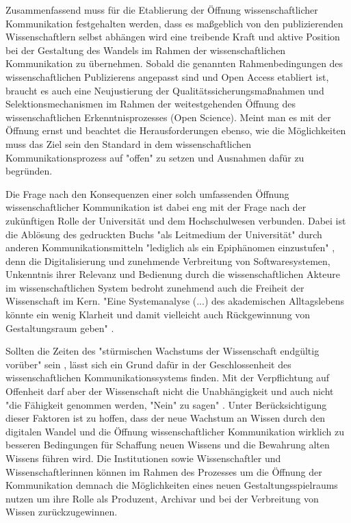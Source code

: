 Zusammenfassend muss für die Etablierung der Öffnung wissenschaftlicher Kommunikation festgehalten werden, dass es maßgeblich von den publizierenden Wissenschaftlern selbst abhängen wird eine treibende Kraft und aktive Position bei der Gestaltung des Wandels im Rahmen der wissenschaftlichen Kommunikation zu übernehmen. Sobald die genannten Rahmenbedingungen des wissenschaftlichen Publizierens angepasst sind und Open Access etabliert ist, braucht es auch eine Neujustierung der Qualitätssicherungsmaßnahmen und Selektionsmechanismen im Rahmen der weitestgehenden Öffnung des wissenschaftlichen Erkenntnisprozesses (Open Science). Meint man es mit der Öffnung ernst und beachtet die Herausforderungen ebenso, wie die Möglichkeiten muss das Ziel sein den Standard in dem wissenschaftlichen Kommunikationsprozess auf "offen" zu setzen und Ausnahmen dafür zu begründen.

Die Frage nach den Konsequenzen einer solch umfassenden Öffnung wissenschaftlicher Kommunikation ist dabei eng mit der Frage nach der zukünftigen Rolle der Universität und dem Hochschulwesen verbunden. Dabei ist die Ablösung des gedruckten Buchs "als Leitmedium der Universität" durch anderen Kommunikationsmitteln "lediglich als ein Epiphänomen einzustufen" \cite{Warnke_2012}, denn die Digitalisierung und zunehmende Verbreitung von Softwaresystemen, Unkenntnis ihrer Relevanz und Bedienung durch die wissenschaftlichen Akteure im wissenschaftlichen System bedroht zunehmend auch die Freiheit der Wissenschaft im Kern. "Eine Systemanalyse (...) des akademischen Alltagslebens  könnte ein wenig Klarheit und damit vielleicht auch Rückgewinnung von Gestaltungsraum geben" \cite{Warnke_2012}.

Sollten die Zeiten des "stürmischen Wachstums der Wissenschaft endgültig vorüber" sein \cite{K_lbel_2002}, lässt sich ein Grund dafür in der Geschlossenheit des wissenschaftlichen Kommunikationssystems finden. Mit der Verpflichtung auf Offenheit darf aber der Wissenschaft nicht die Unabhängigkeit und auch nicht "die Fähigkeit genommen werden, "Nein" zu sagen" \cite{suchen_Hornbostel_2006}. Unter Berücksichtigung dieser Faktoren ist zu hoffen, dass der neue Wachstum an Wissen durch den digitalen Wandel und die Öffnung wissenschaftlicher Kommunikation wirklich zu besseren Bedingungen für Schaffung neuen Wissens und die Bewahrung alten Wissens führen wird. Die Institutionen sowie Wissenschaftler und Wissenschaftlerinnen können im Rahmen des Prozesses um die Öffnung der Kommunikation demnach die Möglichkeiten eines neuen Gestaltungsspielraums nutzen um ihre Rolle als Produzent, Archivar und bei der Verbreitung von Wissen zurückzugewinnen.

